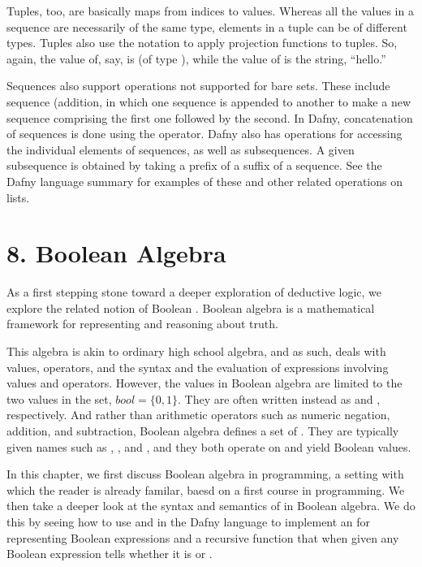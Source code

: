 \documentclass[letterpaper,10pt,english]{sphinxmanual}
\begin{document}
Tuples, too, are basically maps from indices to values. Whereas all
the values in a sequence are necessarily of the same type, elements in
a tuple can be of different types. Tuples also use the  notation
to apply projection functions to tuples. So, again, the value of, say,
 is  (of type ), while the value of
 is the string, “hello.”

Sequences also support operations not supported for bare sets. These
include sequence  (addition, in which one sequence is
appended to another to make a new sequence comprising the first one
followed by the second. In Dafny, concatenation of sequences is done
using the \sphinxstyleemphasis{+} operator. Dafny also has operations for accessing the
individual elements of sequences, as well as subsequences. A given
subsequence is obtained by taking a prefix of a suffix of a sequence.
See the Dafny language summary for examples of these and other related
operations on lists.


\chapter{8. Boolean Algebra}
\label{\detokenize{08-boolean-algebra::doc}}\label{\detokenize{08-boolean-algebra:boolean-algebra}}
As a first stepping stone toward a deeper exploration of deductive
logic, we explore the related notion of Boolean . Boolean
algebra is a mathematical framework for representing and reasoning
about truth.

This algebra is akin to ordinary high school algebra, and as such,
deals with values, operators, and the syntax and the evaluation of
expressions involving values and operators.  However, the values in
Boolean algebra are limited to the two values in the set, \(bool
= \{ 0, 1\}\). They are often written instead as  and ,
respectively. And rather than arithmetic operators such as numeric
negation, addition, and subtraction, Boolean algebra defines a set of
. They are typically given names such as ,
, and , and they both operate on and yield Boolean values.

In this chapter, we first discuss Boolean algebra in programming, a
setting with which the reader is already familar, baesd on a first
course in programming. We then take a deeper look at the syntax and
semantics of  in Boolean algebra. We do this by seeing
how to use  and  in the
Dafny language to implement an  for representing
Boolean expressions and a recursive  function that when
given any Boolean expression tells whether it is  or .
\end{document}

